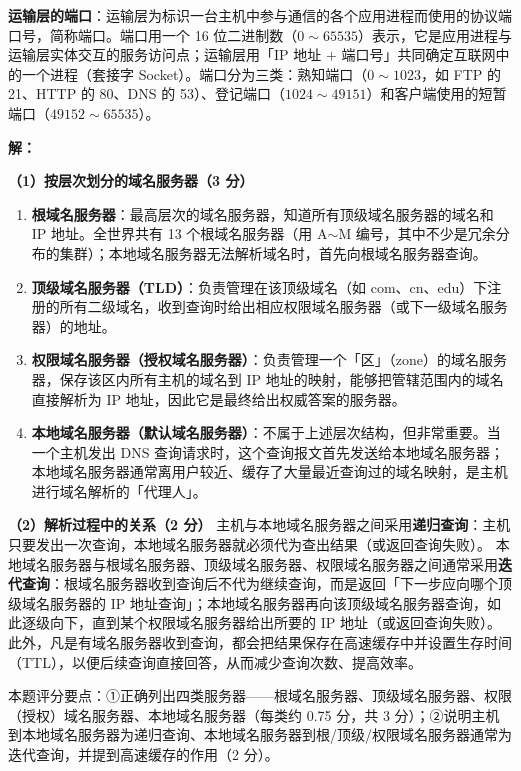 \documentclass[a4paper,11pt]{article}
\begin{document}
\q \textbf{运输层的端口}：运输层为标识一台主机中参与通信的各个应用进程而使用的协议端口号，简称端口。端口用一个 16 位二进制数（\(0\sim65535\)）表示，它是应用进程与运输层实体交互的服务访问点；运输层用「IP 地址 \(+\) 端口号」共同确定互联网中的一个进程（套接字 Socket）。端口分为三类：熟知端口（\(0\sim1023\)，如 FTP 的 21、HTTP 的 80、DNS 的 53）、登记端口（\(1024\sim49151\)）和客户端使用的短暂端口（\(49152\sim65535\)）。

\setcounter{question}{0}

\q \textbf{解：}

\textbf{（1）按层次划分的域名服务器（3 分）}
\begin{enumerate}[leftmargin=2em, itemsep=2pt, topsep=3pt]
  \item \textbf{根域名服务器}：最高层次的域名服务器，知道所有顶级域名服务器的域名和 IP 地址。全世界共有 13 个根域名服务器（用 A\(\sim\)M 编号，其中不少是冗余分布的集群）；本地域名服务器无法解析域名时，首先向根域名服务器查询。
  \item \textbf{顶级域名服务器（TLD）}：负责管理在该顶级域名（如 com、cn、edu）下注册的所有二级域名，收到查询时给出相应权限域名服务器（或下一级域名服务器）的地址。
  \item \textbf{权限域名服务器（授权域名服务器）}：负责管理一个「区」（zone）的域名服务器，保存该区内所有主机的域名到 IP 地址的映射，能够把管辖范围内的域名直接解析为 IP 地址，因此它是最终给出权威答案的服务器。
  \item \textbf{本地域名服务器（默认域名服务器）}：不属于上述层次结构，但非常重要。当一个主机发出 DNS 查询请求时，这个查询报文首先发送给本地域名服务器；本地域名服务器通常离用户较近、缓存了大量最近查询过的域名映射，是主机进行域名解析的「代理人」。
\end{enumerate}

\textbf{（2）解析过程中的关系（2 分）}
主机与本地域名服务器之间采用\textbf{递归查询}：主机只要发出一次查询，本地域名服务器就必须代为查出结果（或返回查询失败）。
本地域名服务器与根域名服务器、顶级域名服务器、权限域名服务器之间通常采用\textbf{迭代查询}：根域名服务器收到查询后不代为继续查询，而是返回「下一步应向哪个顶级域名服务器的 IP 地址查询」；本地域名服务器再向该顶级域名服务器查询，如此逐级向下，直到某个权限域名服务器给出所要的 IP 地址（或返回查询失败）。此外，凡是有域名服务器收到查询，都会把结果保存在高速缓存中并设置生存时间（TTL），以便后续查询直接回答，从而减少查询次数、提高效率。

\begin{analysis}
本题评分要点：①正确列出四类服务器——根域名服务器、顶级域名服务器、权限（授权）域名服务器、本地域名服务器（每类约 0.75 分，共 3 分）；②说明主机到本地域名服务器为递归查询、本地域名服务器到根/顶级/权限域名服务器通常为迭代查询，并提到高速缓存的作用（2 分）。
\end{analysis}
\end{document}
